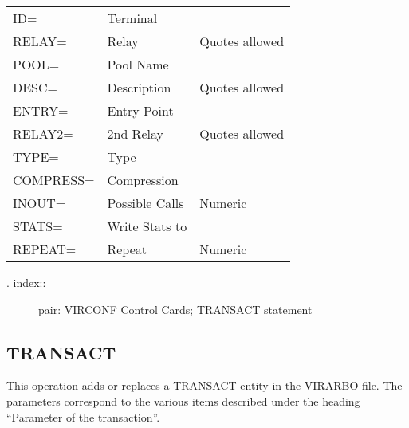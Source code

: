\documentclass[letterpaper,10pt,english]{sphinxmanual}
\begin{document}
\begin{savenotes}\sphinxattablestart
\centering
\begin{tabulary}{\linewidth}[t]{|T|T|T|}
\hline
{}\relax &\relax &\relax \\
\hline
ID=
&
Terminal
&\\
\hline
RELAY=
&
Relay
&
Quotes allowed
\\
\hline
POOL=
&
Pool Name
&\\
\hline
DESC=
&
Description
&
Quotes allowed
\\
\hline
ENTRY=
&
Entry Point
&\\
\hline
RELAY2=
&
2nd Relay
&
Quotes allowed
\\
\hline
TYPE=
&
Type
&\\
\hline
COMPRESS=
&
Compression
&\\
\hline
INOUT=
&
Possible Calls
&
Numeric
\\
\hline
STATS=
&
Write Stats to
&\\
\hline
REPEAT=
&
Repeat
&
Numeric
\\
\hline
\end{tabulary}
\par
\sphinxattableend\end{savenotes}
\begin{description}
\item[{. index::}] \leavevmode
pair: VIRCONF Control Cards; TRANSACT statement

\end{description}


\subsection{TRANSACT}
\label{\detokenize{Installation_Guide:transact}}
This operation adds or replaces a TRANSACT entity in the VIRARBO file. The parameters correspond to the various items described under the heading “Parameter of the transaction”.
\end{document}

